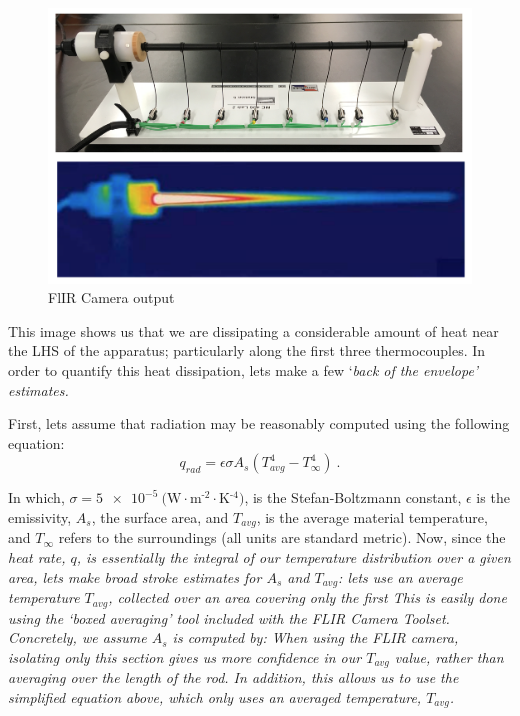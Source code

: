 \documentclass[11pt, letterpaper]{article}
\begin{document}
\begin{figure}[H]
    \begin{center}
        \includegraphics[width=125mm]{gfx/FLIR.png}
    \caption{FlIR Camera output}\label{fig2}
    \end{center}
\end{figure}

\n
This image shows us that we are dissipating a considerable amount of heat near the LHS of the apparatus; particularly along the first three thermocouples. In order to quantify this heat dissipation, lets make a few `\it{back of the envelope}' estimates.

\n
First, lets assume that radiation may be reasonably computed using the following equation:
\begin{equation}
q_{rad} = \epsilon \sigma A_s ( T_{avg}^4 - T_\infty^4 ) \ . \label{Eq1}
\end{equation}

\n
In which, $\sigma = \SI{5e-5}{(\watt\cdot\meter^{\text{-}2}\cdot\kelvin^{\text{-}4})} $, is the Stefan-Boltzmann constant, $\epsilon$ is the emissivity, $A_s$, the surface area, and $T_{avg}$, is the average material temperature, and $T_\infty$ refers to the surroundings (all units are standard metric).
\n
Now, since the \it{heat rate}, $q$, is essentially the integral of our temperature distribution over a given area, lets make \it{broad stroke} estimates for $A_s$ and $T_{avg}$: lets use an average temperature $T_{avg}$, collected over an area covering only the first  This is easily done using the `\it{boxed averaging}' tool included with the FLIR Camera Toolset. Concretely, we assume $A_s$ is computed by:
\n
When using the FLIR camera, isolating only this section gives us more confidence in our $T_{avg}$ value, rather than averaging over the length of the rod. In addition, this allows us to use the simplified equation above, which only uses an averaged temperature, $T_{avg}$.
\end{document}
